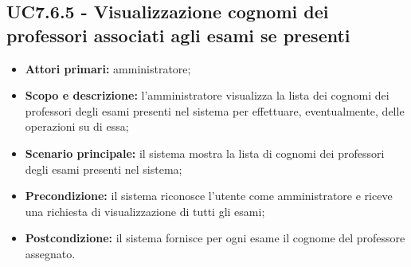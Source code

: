 \documentclass[AnalisiDeiRequisiti.tex]{subfiles}
\begin{document}
\subsection{UC7.6.5 - Visualizzazione cognomi dei professori associati agli esami se presenti}
\begin{itemize}
	\item \textbf{Attori primari:} amministratore;
	\item \textbf{Scopo e descrizione:} l'amministratore visualizza la lista dei cognomi dei professori degli esami presenti nel sistema per effettuare, eventualmente, delle operazioni su di essa;
	\item \textbf{Scenario principale:} il sistema mostra la lista di cognomi dei professori degli esami presenti nel sistema;
	\item \textbf{Precondizione:} il sistema riconosce l'utente come amministratore e riceve una richiesta di visualizzazione di tutti gli esami; 
	\item \textbf{Postcondizione:} il sistema fornisce per ogni esame il cognome del professore assegnato.
\end{itemize}
\end{document}
